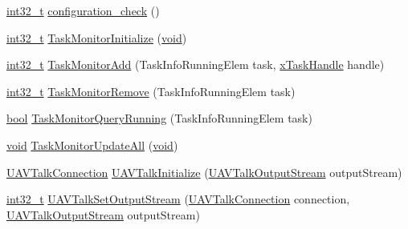 \begin{DoxyCompactItemize}
\item 
\hyperlink{group___n_a_m_e_gafd12020da5a235dfcf0c3c748fb5baed}{int32\-\_\-t} \hyperlink{group___open_pilot_libraries_gabcb80832a82e492c119a231984eba10a}{configuration\-\_\-check} ()
\item 
\hyperlink{group___n_a_m_e_gafd12020da5a235dfcf0c3c748fb5baed}{int32\-\_\-t} \hyperlink{group___open_pilot_libraries_ga1d9cdd0b4255485c84d4a695a4a9ae0f}{Task\-Monitor\-Initialize} (\hyperlink{group___n_a_m_e_ga18028b8badbf1ea7e704ccac3c488e82}{void})
\item 
\hyperlink{group___n_a_m_e_gafd12020da5a235dfcf0c3c748fb5baed}{int32\-\_\-t} \hyperlink{group___open_pilot_libraries_ga092c2aa7f99dfb3f394bf3b086f6ef45}{Task\-Monitor\-Add} (Task\-Info\-Running\-Elem task, \hyperlink{_common_2_libraries_2_free_r_t_o_s_2_source_2include_2task_8h_a271ae40d5db07d928a113766505a0965}{x\-Task\-Handle} handle)
\item 
\hyperlink{group___n_a_m_e_gafd12020da5a235dfcf0c3c748fb5baed}{int32\-\_\-t} \hyperlink{group___open_pilot_libraries_ga6c09782e470b26f4506a57ada8037664}{Task\-Monitor\-Remove} (Task\-Info\-Running\-Elem task)
\item 
\hyperlink{group___exported__types_gaf6a258d8f3ee5206d682d799316314b1}{bool} \hyperlink{group___open_pilot_libraries_ga2212575f7dbf4b2452fb7baa81b48115}{Task\-Monitor\-Query\-Running} (Task\-Info\-Running\-Elem task)
\item 
\hyperlink{group___n_a_m_e_ga18028b8badbf1ea7e704ccac3c488e82}{void} \hyperlink{group___open_pilot_libraries_ga35c7698b89cc04a2fce87ed36b155fc0}{Task\-Monitor\-Update\-All} (\hyperlink{group___n_a_m_e_ga18028b8badbf1ea7e704ccac3c488e82}{void})
\item 
\hyperlink{group___open_pilot_libraries_gaeff1721eaebd4ab306057b4017f23f36}{U\-A\-V\-Talk\-Connection} \hyperlink{group___open_pilot_libraries_ga91e20b57ed132bab36c9ca723d9bdac4}{U\-A\-V\-Talk\-Initialize} (\hyperlink{group___open_pilot_libraries_ga0c67fb4d23157d56fe1982e4788938c7}{U\-A\-V\-Talk\-Output\-Stream} output\-Stream)
\item 
\hyperlink{group___n_a_m_e_gafd12020da5a235dfcf0c3c748fb5baed}{int32\-\_\-t} \hyperlink{group___open_pilot_libraries_ga33f8221bbddbf94c7379c3230eac1501}{U\-A\-V\-Talk\-Set\-Output\-Stream} (\hyperlink{group___open_pilot_libraries_gaeff1721eaebd4ab306057b4017f23f36}{U\-A\-V\-Talk\-Connection} connection, \hyperlink{group___open_pilot_libraries_ga0c67fb4d23157d56fe1982e4788938c7}{U\-A\-V\-Talk\-Output\-Stream} output\-Stream)
\item 

\end{DoxyCompactItemize}
